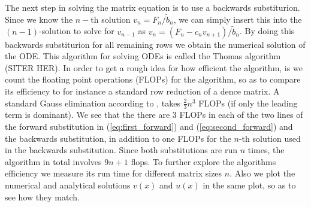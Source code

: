 \documentclass[twocolumn]{aastex62}
\begin{document}
The next step in solving the matrix equation is to use a backwards substiturion. Since we know the $n-$th solution $v_n = F_n/\tilde{b}_n$, we can simply insert this into the $(n-1)$-solution to solve for $v_{n-1}$ as $v_{n} = (F_{n} - c_{n}v_{n+1})/ \tilde{b}_{n}$. By doing this backwards substiturion for all remaining rows we obtain the numerical solution of the ODE. This algorithm for solving ODEs is called the Thomas algorithm (SITER HER). In order to get a rough idea for how efficient the algorithm, is we count the floating point operations (FLOPs) for the algorithm, so as to compare its efficiency to for instance a standard row reduction of a dence matrix. A standard Gauss elimination according to \citep{Boyd:2004}, takes $\frac{2}{3}n^3$ FLOPs (if only the leading term is dominant). We see that the there are 3 FLOPs in each of the two lines of the forward substitution in (\ref{eq:first_forward}) and (\ref{eq:second_forward}) and the backwards substitution, in addition to one FLOPs for the $n$-th solution used in the backwards substitution. Since both substitutions are run $n$ times, the algorithm in total involves $9n + 1$ flops. To further explore the algorithms efficiency we measure its run time for different matrix sizes $n$. Also we plot the numerical and analytical solutions $v(x)$ and $u(x)$ in the same plot, so as to see how they match. 
\end{document}
